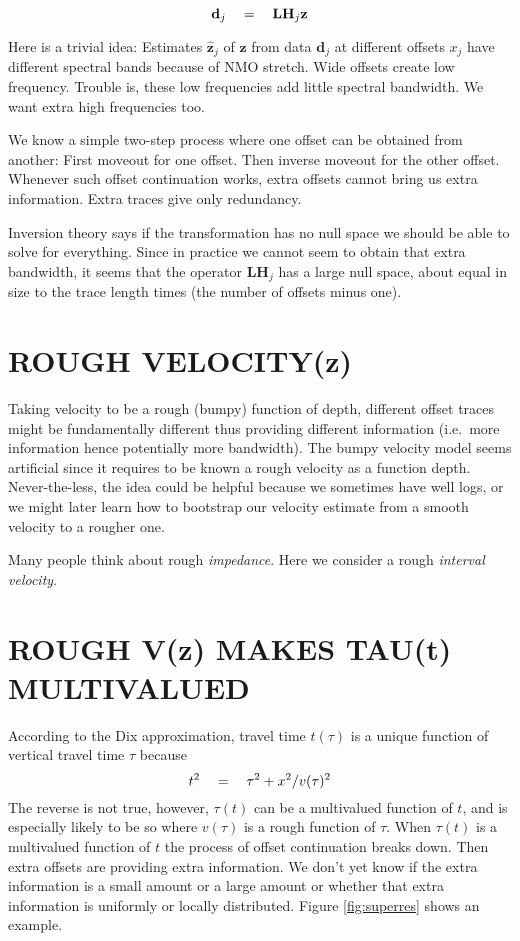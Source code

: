 \begin{equation}
\mathbf d_j \quad =\quad  \mathbf L \mathbf H_j \mathbf z
\end{equation}
\par
Here is a trivial idea:
Estimates $\hat{\mathbf z}_j$
of $\mathbf z$ from data
$\mathbf d_j$
at different offsets $x_j$
have different spectral bands because of NMO stretch.
Wide offsets create low frequency.
Trouble is, these low frequencies add little spectral bandwidth.
We want extra high frequencies too.

\par
We know a simple two-step process where
one offset can be obtained from another:
First moveout for one offset.  Then inverse moveout for the other offset.
Whenever such offset continuation works,
extra offsets cannot bring us extra information.
Extra traces give only redundancy.

\par
Inversion theory says if the transformation has no null space
we should be able to solve for everything.
Since in practice we cannot seem to obtain that extra bandwidth,
it seems that
the operator $\mathbf L \mathbf H_j $
has a large null space,
about equal in size to the trace length times
(the number of offsets minus one).



\section{ROUGH VELOCITY(z)}

Taking velocity to be a rough (bumpy) function of depth,
different offset traces might be fundamentally different
thus providing different information
(i.e.~more information hence potentially more bandwidth).
The bumpy velocity model
seems artificial since it requires
to be known a rough velocity as a function depth.
Never-the-less, the idea could be helpful
because
we sometimes have well logs,
or we might later
learn how to bootstrap our velocity estimate
from a smooth velocity to a rougher one.

\par
Many people think about rough {\it impedance}.
Here we consider a rough {\it interval velocity}.


\section{ROUGH V(z) MAKES TAU(t) MULTIVALUED}

According to the Dix approximation,
travel time $t(\tau)$ is a unique function of
vertical travel time $\tau$ because
\begin{equation}
t^2 \quad =\quad \tau^2 + x^2 / v(\tau)^2
\end{equation}
The reverse is not true, however,
$\tau(t)$ can be a multivalued function of $t$,
and is especially likely to be so
where $v(\tau)$ is a rough function of $\tau$.
When $\tau(t)$ is a multivalued function of $t$
the process of offset continuation breaks down.
Then extra offsets are providing extra information.
We don't yet know if the extra information is a small amount
or a large amount or whether that extra information
is uniformly or locally distributed.
Figure \ref{fig:superres} shows an example.

